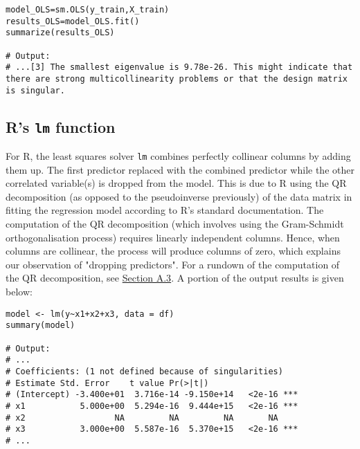 \documentclass[12pt]{article}
\begin{document}
	\begin{lstlisting}
model_OLS=sm.OLS(y_train,X_train)
results_OLS=model_OLS.fit()
summarize(results_OLS)

# Output:
# ...[3] The smallest eigenvalue is 9.78e-26. This might indicate that there are strong multicollinearity problems or that the design matrix is singular.
	\end{lstlisting}
	\pagebreak
	\subsection{R's \texttt{lm} function}
	For R, the least squares solver \texttt{lm} combines perfectly collinear columns by adding them up. The first predictor replaced with the combined predictor while the other correlated variable(s) is dropped from the model. This is due to R using the QR decomposition (as opposed to the pseudoinverse previously) of the data matrix in fitting the regression model according to R's standard documentation. The computation of the QR decomposition (which involves using the Gram-Schmidt orthogonalisation process) requires linearly independent columns. Hence, when columns are collinear, the process will produce columns of zero, which explains our observation of "dropping predictors". For a rundown of the computation of the QR decomposition, see \hyperref[sec:qr]{Section A.3}. A portion of the output results is given below:\\
	\begin{lstlisting}
model <- lm(y~x1+x2+x3, data = df)
summary(model)

# Output: 
# ...
# Coefficients: (1 not defined because of singularities)
# Estimate Std. Error    t value Pr(>|t|)    
# (Intercept) -3.400e+01  3.716e-14 -9.150e+14   <2e-16 ***
# x1           5.000e+00  5.294e-16  9.444e+15   <2e-16 ***
# x2                  NA         NA         NA       NA    
# x3           3.000e+00  5.587e-16  5.370e+15   <2e-16 ***
# ...
	\end{lstlisting}
	\vspace{2mm}
	
\end{document}
